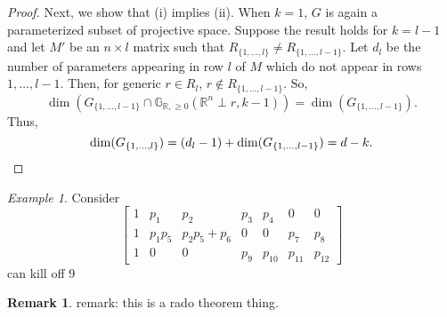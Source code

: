 \documentclass[11pt]{article}
\newcommand{\R}{\mathbb{R}}
\newcommand{\Gr}{\mathbb{G}_{\R, \geq 0}}
\theoremstyle{remark}
\newtheorem{eg}[thm]{Example}
\theoremstyle{definition}
\newtheorem{rmk}[thm]{Remark}
\begin{document}
\begin{appendices}
\begin{proof}
Next, we show that (i) implies (ii). When $k = 1$, $G$ is again a parameterized subset of projective space. Suppose the result holds for $k = l-1$ and let $M'$ be an $n \times l$ matrix such that $R_{\{1,\dots,l\}} \neq R_{\{1,\dots,l-1\}}$. Let $d_l$ be the number of parameters appearing in row $l$ of $M$ which do not appear in rows $1, \dots, l-1$. Then, for generic $r \in R_{l}$, $r \notin R_{\{1,\dots,l-1\}}$. So,
%
\begin{displaymath}
\dim(G_{\{1,\dots,l-1\}} \cap \Gr(\mathbb{R}^n \perp r, k-1)) = \dim(G_{\{1,\dots,l-1\}}).
\end{displaymath}
%
\noindent
Thus,
%
\begin{displaymath}
\dim(G_{\{1,\dots,l\}}) = (d_l - 1) + \dim(G_{\{1,\dots,l-1\}}) = d-k.
\qedhere
\end{displaymath}
\end{proof}

\begin{eg}
Consider
\begin{displaymath}
\begin{bmatrix}
1 & p_1 & p_2 & p_3 & p_4 & 0 & 0 \\
1 & p_1 p_5 & p_2 p_5 + p_6 & 0 & 0 & p_7 & p_8 \\
1 & 0 & 0 & p_9 & p_{10} & p_{11} & p_{12}
\end{bmatrix}
\end{displaymath}
can kill off 9
\end{eg}

\begin{rmk}
remark: this is a rado theorem thing.
\end{rmk}

\end{appendices}
\end{document}
